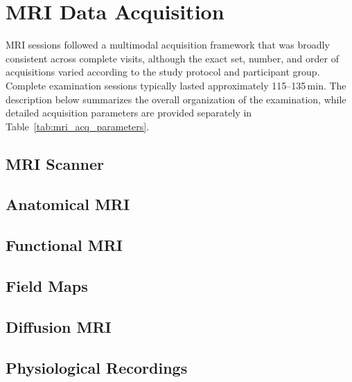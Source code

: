 \section{MRI Data Acquisition}
\label{sec:mri_acquisition}

MRI sessions followed a multimodal acquisition framework that was broadly consistent
across complete visits, although the exact set, number, and order of acquisitions varied
according to the study protocol and participant group. Complete examination sessions
typically lasted approximately 115--135\,min. The description below summarizes the overall
organization of the examination, while detailed acquisition parameters are provided
separately in Table~\ref{tab:mri_acq_parameters}.



\subsection{MRI Scanner}



\subsection{Anatomical MRI}




\subsection{Functional MRI}



\subsection{Field Maps}



\subsection{Diffusion MRI}





\subsection{Physiological Recordings}


